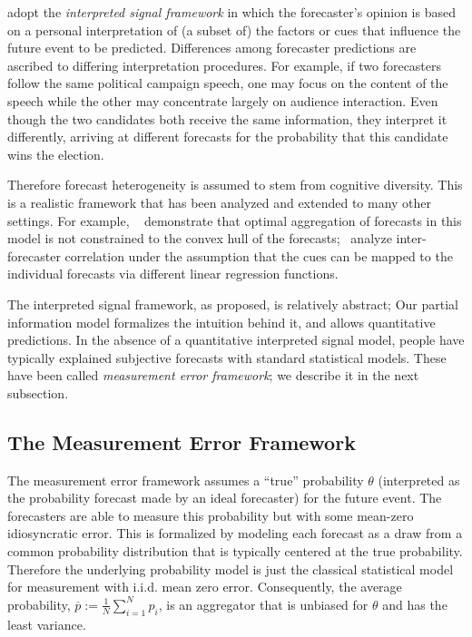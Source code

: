 \documentclass[11pt]{article}
\theoremstyle{definition}
\theoremstyle{definition}
\def\pb{\overline{p}}
\begin{document}
\citet{hong2009interpreted} adopt the {\em interpreted signal
framework} in which the forecaster's opinion is based on a personal
interpretation of (a subset of) the factors or cues that influence the
future event to be predicted.  Differences among forecaster
predictions are ascribed to differing interpretation procedures.  For
example, if two forecasters follow the same political campaign speech,
one may focus on the content of the speech while the other may
concentrate largely on audience interaction.  Even though the two
candidates both receive the same information, they interpret it
differently, arriving at different forecasts for the probability that
this candidate wins the election.

Therefore forecast heterogeneity is assumed to stem from cognitive
diversity.  This is a realistic framework that has been analyzed and
extended to many other settings.  For example,
~\citet{parunak2013characterizing} demonstrate that optimal
aggregation of forecasts in this model is not constrained to the
convex hull of the forecasts;~\citet{broomell2009experts} analyze
inter-forecaster correlation under the assumption that the cues can be
mapped to the individual forecasts via different linear regression
functions.

The interpreted signal framework, as proposed, is relatively abstract;
Our partial information model formalizes the intuition behind it, and
allows quantitative predictions. In the absence of a quantitative
interpreted signal model, people have typically explained subjective
forecasts with standard statistical models. These have been called
\textit{measurement error framework}; we describe it in the next
subsection.

%

\subsection{The Measurement Error Framework}
\label{ss:measurement}
The measurement error framework assumes a ``true'' probability
$\theta$ (interpreted as the probability forecast made by an ideal
forecaster) for the future event.  The forecasters are able to measure
this probability but with some mean-zero idiosyncratic error.  This is
formalized by modeling each forecast as a draw from a common
probability distribution that is typically centered at the true
probability. Therefore the underlying probability model is just the 
classical statistical model for measurement with i.i.d. mean zero error.
Consequently, the average probability, $\pb := \frac{1}{N}\sum_{i=1}^N
p_i$, is an aggregator that is unbiased for $\theta$ and has the least
variance.
\end{document}
